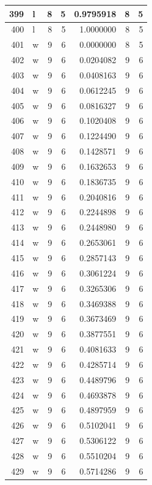 \documentclass[
  letterpaper,
  DIV=11,
  numbers=noendperiod]{scrreprt}
\begin{document}
\begin{table}
\begin{tabular}[t]{r|l|r|r|r|r|r}
\hline
399 & l & 8 & 5 & 0.9795918 & 8 & 5\\
\hline
400 & l & 8 & 5 & 1.0000000 & 8 & 5\\
\hline
401 & w & 9 & 6 & 0.0000000 & 8 & 5\\
\hline
402 & w & 9 & 6 & 0.0204082 & 9 & 6\\
\hline
403 & w & 9 & 6 & 0.0408163 & 9 & 6\\
\hline
404 & w & 9 & 6 & 0.0612245 & 9 & 6\\
\hline
405 & w & 9 & 6 & 0.0816327 & 9 & 6\\
\hline
406 & w & 9 & 6 & 0.1020408 & 9 & 6\\
\hline
407 & w & 9 & 6 & 0.1224490 & 9 & 6\\
\hline
408 & w & 9 & 6 & 0.1428571 & 9 & 6\\
\hline
409 & w & 9 & 6 & 0.1632653 & 9 & 6\\
\hline
410 & w & 9 & 6 & 0.1836735 & 9 & 6\\
\hline
411 & w & 9 & 6 & 0.2040816 & 9 & 6\\
\hline
412 & w & 9 & 6 & 0.2244898 & 9 & 6\\
\hline
413 & w & 9 & 6 & 0.2448980 & 9 & 6\\
\hline
414 & w & 9 & 6 & 0.2653061 & 9 & 6\\
\hline
415 & w & 9 & 6 & 0.2857143 & 9 & 6\\
\hline
416 & w & 9 & 6 & 0.3061224 & 9 & 6\\
\hline
417 & w & 9 & 6 & 0.3265306 & 9 & 6\\
\hline
418 & w & 9 & 6 & 0.3469388 & 9 & 6\\
\hline
419 & w & 9 & 6 & 0.3673469 & 9 & 6\\
\hline
420 & w & 9 & 6 & 0.3877551 & 9 & 6\\
\hline
421 & w & 9 & 6 & 0.4081633 & 9 & 6\\
\hline
422 & w & 9 & 6 & 0.4285714 & 9 & 6\\
\hline
423 & w & 9 & 6 & 0.4489796 & 9 & 6\\
\hline
424 & w & 9 & 6 & 0.4693878 & 9 & 6\\
\hline
425 & w & 9 & 6 & 0.4897959 & 9 & 6\\
\hline
426 & w & 9 & 6 & 0.5102041 & 9 & 6\\
\hline
427 & w & 9 & 6 & 0.5306122 & 9 & 6\\
\hline
428 & w & 9 & 6 & 0.5510204 & 9 & 6\\
\hline
429 & w & 9 & 6 & 0.5714286 & 9 & 6\\

\end{tabular}
\end{table}
\end{document}
